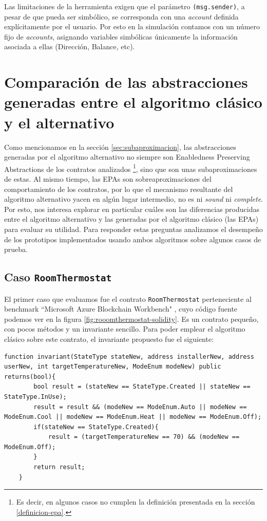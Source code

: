 Las limitaciones de la herramienta exigen que el parámetro \texttt{(msg.sender)}, a pesar de que pueda ser simbólico, se corresponda con una \textit{account} definida explícitamente por el usuario.
Por esto en la simulación contamos con un número fijo de \textit{accounts}, asignando variables simbólicas únicamente la información asociada a ellas (Dirección, Balance, etc).

\section{Comparación de las abstracciones generadas entre el algoritmo clásico y el alternativo}
Como mencionamos en la sección \ref{sec:subaproximacion}, las abstracciones generadas por el algoritmo alternativo no siempre son Enabledness Preserving Abstractions de los contratos analizados \footnote{Es decir, en algunos casos no cumplen la definición presentada en la sección \ref{definicion-epa}.}, sino que son unas subaproximaciones de estas.
Al mismo tiempo, las EPAs son sobreaproximaciones del comportamiento de los contratos, por lo que el mecanismo resultante del algoritmo alternativo yacen en algún lugar intermedio, no es ni \textit{sound} ni \textit{complete}.
Por esto, nos interesa explorar en particular cuáles son las diferencias producidas entre el algoritmo alternativo y las generadas por el algoritmo clásico (las EPAs) para evaluar su utilidad.
Para responder estas preguntas analizamos el desempeño de los prototipos implementados usando ambos algoritmos sobre algunos casos de prueba.

\subsection{Caso \texttt{RoomThermostat}}
El primer caso que evaluamos fue el contrato \texttt{RoomThermostat} perteneciente al benchmark ``Microsoft Azure Blockchain Workbench" \cite{azure-benchmark}, cuyo código fuente podemos ver en la figura \ref{fig:rooomthermostat-solidity}.
Es un contrato pequeño, con pocos métodos y un invariante sencillo.
Para poder emplear el algoritmo clásico sobre este contrato, el invariante propuesto fue el siguiente:
\begin{lstlisting}[language=Solidity]
    function invariant(StateType stateNew, address installerNew, address userNew, int targetTemperatureNew, ModeEnum modeNew) public returns(bool){
        bool result = (stateNew == StateType.Created || stateNew == StateType.InUse);
        result = result && (modeNew == ModeEnum.Auto || modeNew == ModeEnum.Cool || modeNew == ModeEnum.Heat || modeNew == ModeEnum.Off);
        if(stateNew == StateType.Created){
            result = (targetTemperatureNew == 70) && (modeNew == ModeEnum.Off);
        }
        return result;
    }
\end{lstlisting}

